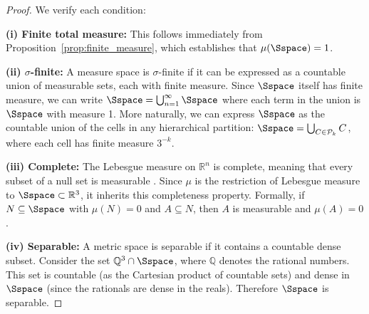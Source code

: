 \begin{proof}
We verify each condition:

\textbf{(i) Finite total measure:} This follows immediately from Proposition~\ref{prop:finite_measure}, which establishes that $\mu(\Sspace) = 1$.

\textbf{(ii) $\sigma$-finite:} A measure space is $\sigma$-finite if it can be expressed as a countable union of measurable sets, each with finite measure. Since $\Sspace$ itself has finite measure, we can write $\Sspace = \bigcup_{n=1}^{\infty} \Sspace$ where each term in the union is $\Sspace$ with measure 1. More naturally, we can express $\Sspace$ as the countable union of the cells in any hierarchical partition: $\Sspace = \bigcup_{C \in \mathcal{P}_k} C$, where each cell has finite measure $3^{-k}$.

\textbf{(iii) Complete:} The Lebesgue measure on $\mathbb{R}^n$ is complete, meaning that every subset of a null set is measurable \citep{royden1988real}. Since $\mu$ is the restriction of Lebesgue measure to $\Sspace \subset \mathbb{R}^3$, it inherits this completeness property. Formally, if $N \subseteq \Sspace$ with $\mu(N) = 0$ and $A \subseteq N$, then $A$ is measurable and $\mu(A) = 0$.

\textbf{(iv) Separable:} A metric space is separable if it contains a countable dense subset. Consider the set $\mathbb{Q}^3 \cap \Sspace$, where $\mathbb{Q}$ denotes the rational numbers. This set is countable (as the Cartesian product of countable sets) and dense in $\Sspace$ (since the rationals are dense in the reals). Therefore $\Sspace$ is separable.
\end{proof}

